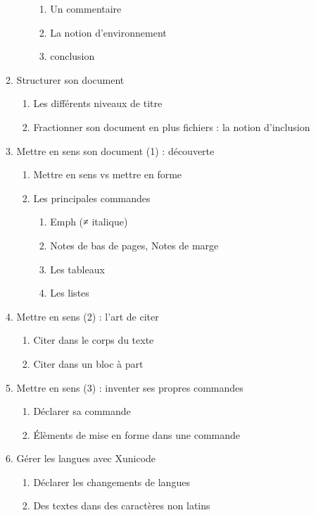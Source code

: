 \begin{enumerate}
\begin{enumerate}
\begin{enumerate}
\begin{enumerate}
			\item Un commentaire
			\item La notion d'environnement
			\item conclusion	
		\end{enumerate}
	\end{enumerate} 
	\item{Structurer son document}
		\begin{enumerate}	
		\item Les différents niveaux de titre
		\item Fractionner son document en plus fichiers : la notion d'inclusion
		\end{enumerate}
	\item Mettre en sens son document (1) : découverte
	\begin{enumerate}
		\item Mettre en sens vs mettre en forme
		\item Les principales commandes
		\begin{enumerate}
			\item Emph (≠ italique)
			\item Notes de bas de pages, Notes de marge
			\item Les tableaux
			\item Les listes
		\end{enumerate}
	\end{enumerate}
	\item Mettre en sens (2) : l'art de citer
		\begin{enumerate}
		\item Citer dans le corps du texte
		\item Citer dans un bloc à part
		\end{enumerate}
	\item Mettre en sens (3) : inventer ses propres commandes
		\begin{enumerate}
		\item Déclarer sa commande
		\item Élèments de mise en forme dans une commande
		\end{enumerate}
	\item Gérer les langues avec Xunicode
		\begin{enumerate}
		\item Déclarer les changements de langues
		\item Des textes dans des caractères non latins
		\begin{enumerate}

\end{enumerate}
\end{enumerate}
\end{enumerate}
\end{enumerate}
